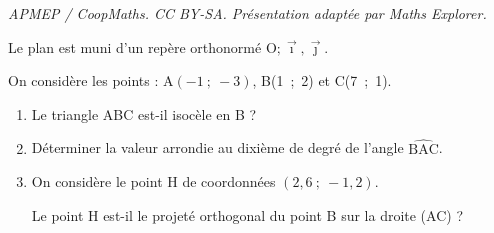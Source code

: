 \documentclass[10pt]{article}
\providecommand{\Oij}{\(\mathrm{O};\vec{\imath},\vec{\jmath}\)}
\begin{document}
\noindent\textit{APMEP / CoopMaths. CC BY-SA. Présentation adaptée par Maths Explorer.}\par\medskip
\medskip
Le plan est muni d'un repère orthonormé \Oij.

On considère les points : A$(-1~;~- 3)$, B(1~;~2) et C(7~;~1).

\medskip

\begin{enumerate}
\item Le triangle ABC est-il isocèle en B ?
\item Déterminer la valeur arrondie au dixième de degré de l'angle $\widehat{\text{BAC}}$.
\item On considère le point H de coordonnées $(2,6~;~- 1,2)$.

Le point H est-il le projeté orthogonal du point B sur la droite (AC) ?
\end{enumerate}

\bigskip
\end{document}
